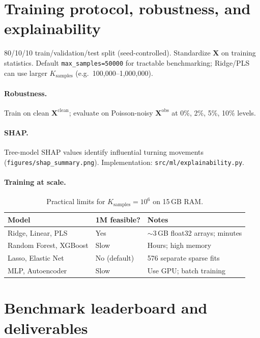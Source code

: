 \documentclass[11pt,a4paper]{report}
\newcommand{\mathbfX}{\mathbf{X}}
\begin{document}
\section{Training protocol, robustness, and explainability}
\label{sec:ch3-training}

80/10/10 train/validation/test split (seed-controlled). Standardize $\mathbfX$ on training statistics. Default \texttt{max\_samples=50000} for tractable benchmarking; Ridge/PLS can use larger $K_{\mathrm{samples}}$ (e.g.\ 100{,}000--1{,}000{,}000).

\paragraph{Robustness.}
Train on clean $\mathbfX^{\mathrm{clean}}$; evaluate on Poisson-noisy $\mathbfX^{\mathrm{obs}}$ at 0\%, 2\%, 5\%, 10\% levels.

\paragraph{SHAP.}
Tree-model SHAP values identify influential turning movements (\texttt{figures/shap\_summary.png}). Implementation: \texttt{src/ml/explainability.py}.

\paragraph{Training at scale.}
\begin{table}[ht]
\centering
\caption{Practical limits for $K_{\mathrm{samples}}=10^6$ on 15\,GB RAM.}
\label{tab:ml_scale}
\small
\begin{tabular}{@{}lll@{}}
\toprule
\textbf{Model} & \textbf{1M feasible?} & \textbf{Notes} \\
\midrule
Ridge, Linear, PLS & Yes & $\sim$3\,GB float32 arrays; minutes \\
Random Forest, XGBoost & Slow & Hours; high memory \\
Lasso, Elastic Net & No (default) & 576 separate sparse fits \\
MLP, Autoencoder & Slow & Use GPU; batch training \\
\bottomrule
\end{tabular}
\end{table}


\section{Benchmark leaderboard and deliverables}
\label{sec:ch3-benchmark}
\end{document}
